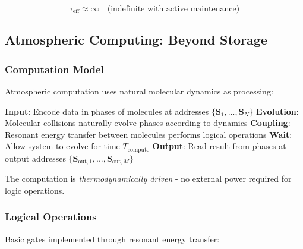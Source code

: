 \begin{equation}
\tau_{\text{eff}} \approx \infty \quad \text{(indefinite with active maintenance)}
\end{equation}

\subsection{Atmospheric Computing: Beyond Storage}

\subsubsection{Computation Model}

Atmospheric computation uses natural molecular dynamics as processing:

\begin{algorithmic}[1]
\State \textbf{Input}: Encode data in phases of molecules at addresses $\{\mathbf{S}_1, ..., \mathbf{S}_N\}$
\State \textbf{Evolution}: Molecular collisions naturally evolve phases according to dynamics
\State \textbf{Coupling}: Resonant energy transfer between molecules performs logical operations
\State \textbf{Wait}: Allow system to evolve for time $T_{\text{compute}}$
\State \textbf{Output}: Read result from phases at output addresses $\{\mathbf{S}_{\text{out},1}, ..., \mathbf{S}_{\text{out},M}\}$
\end{algorithmic}

The computation is \textit{thermodynamically driven} - no external power required for logic operations.

\subsubsection{Logical Operations}

Basic gates implemented through resonant energy transfer:

